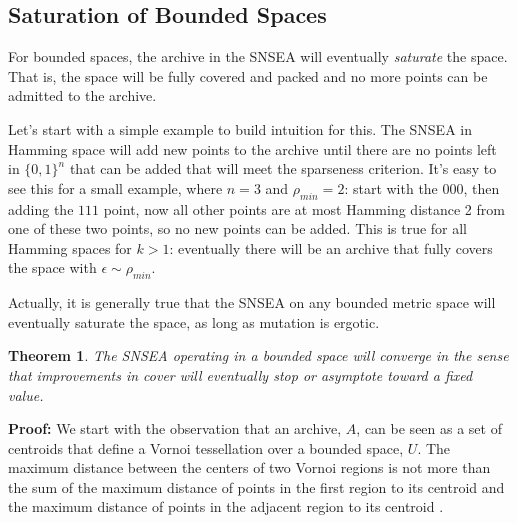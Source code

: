 \documentclass[twoside]{article}
\newtheorem{theorem}{Theorem}
\begin{document}
\subsection{Saturation of Bounded Spaces}
\label{subsec:saturation}
For bounded spaces, the archive in the SNSEA will eventually \emph{saturate} the space.  That is, the space will be fully covered and packed and no more points can be admitted to the archive.  

Let's start with a simple example to build intuition for this.  The  SNSEA in Hamming space will add new points to the archive until there are no points left in $\{0,1\}^n$ that can be added that will meet the sparseness criterion.  It's easy to see this for a small example, where $n=3$ and $\rho_{min} = 2$:  start with the $000$, then adding the $111$ point, now all other points are at most Hamming distance 2 from one of these two points, so no new points can be added.  This is true for all Hamming spaces for $k>1$:  eventually there will be an archive that fully covers the space with $\epsilon \sim \rho_{min}$.

Actually, it is generally true that the SNSEA on any bounded metric space will eventually saturate the space, as long as mutation is ergotic.
\begin{theorem}
The SNSEA operating in a bounded space will converge in the sense that improvements in \emph{cover} will eventually stop or asymptote toward a fixed value.
\end{theorem}
\textbf{Proof:} We start with the observation that an archive, $A$, can be seen as a set of centroids that define a Vornoi tessellation \citep{Franz1991acmcs} over a bounded space, $U$.  The maximum distance between the centers of two Vornoi regions is not more than the sum of the maximum distance of points in the first region to its centroid and the maximum distance of points in the adjacent region to its centroid \citep{Franz1991acmcs}.  
\end{document}
